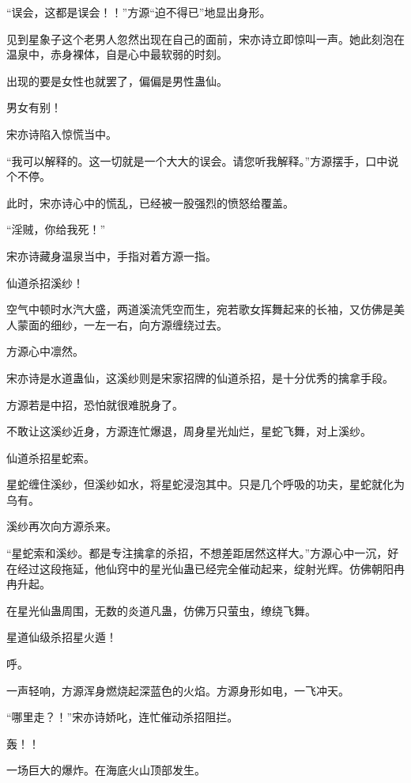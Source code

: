 
\begin{this_body}



“误会，这都是误会！！”方源“迫不得已”地显出身形。

见到星象子这个老男人忽然出现在自己的面前，宋亦诗立即惊叫一声。她此刻泡在温泉中，赤身裸体，自是心中最软弱的时刻。

出现的要是女性也就罢了，偏偏是男性蛊仙。

男女有别！

宋亦诗陷入惊慌当中。

“我可以解释的。这一切就是一个大大的误会。请您听我解释。”方源摆手，口中说个不停。

此时，宋亦诗心中的慌乱，已经被一股强烈的愤怒给覆盖。

“淫贼，你给我死！”

宋亦诗藏身温泉当中，手指对着方源一指。

仙道杀招溪纱！

空气中顿时水汽大盛，两道溪流凭空而生，宛若歌女挥舞起来的长袖，又仿佛是美人蒙面的细纱，一左一右，向方源缠绕过去。

方源心中凛然。

宋亦诗是水道蛊仙，这溪纱则是宋家招牌的仙道杀招，是十分优秀的擒拿手段。

方源若是中招，恐怕就很难脱身了。

不敢让这溪纱近身，方源连忙爆退，周身星光灿烂，星蛇飞舞，对上溪纱。

仙道杀招星蛇索。

星蛇缠住溪纱，但溪纱如水，将星蛇浸泡其中。只是几个呼吸的功夫，星蛇就化为乌有。

溪纱再次向方源杀来。

“星蛇索和溪纱。都是专注擒拿的杀招，不想差距居然这样大。”方源心中一沉，好在经过这段拖延，他仙窍中的星光仙蛊已经完全催动起来，绽射光辉。仿佛朝阳冉冉升起。

在星光仙蛊周围，无数的炎道凡蛊，仿佛万只萤虫，缭绕飞舞。

星道仙级杀招星火遁！

呼。

一声轻响，方源浑身燃烧起深蓝色的火焰。方源身形如电，一飞冲天。

“哪里走？！”宋亦诗娇叱，连忙催动杀招阻拦。

轰！！

一场巨大的爆炸。在海底火山顶部发生。


\end{this_body}
